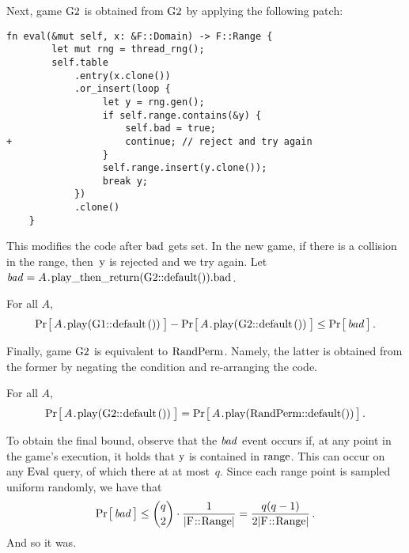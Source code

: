 Next, game $\code{G2}$ is obtained from $\code{G2}$ by applying the following patch:
%
\begin{lstlisting}[style=patch]
    fn eval(&mut self, x: &F::Domain) -> F::Range {
        let mut rng = thread_rng();
        self.table
            .entry(x.clone())
            .or_insert(loop {
                 let y = rng.gen();
                 if self.range.contains(&y) {
                     self.bad = true;
+                    continue; // reject and try again
                 }
                 self.range.insert(y.clone());
                 break y;
            })
            .clone()
    }
\end{lstlisting}
%
This modifies the code after $\code{bad}$ gets set. In the new game, if there
is a collision in the range, then~$\code{y}$ is rejected and we try again.
%
Let $\bad = A\code{.play_then_return(G2::default()).bad}$.
%
\begin{claim}
  For all $A$,
  \[
     \Prob{A\code{.play(G1::default())}} -
     \Prob{A\code{.play(G2::default())}} \leq \Prob{\bad} \,.
  \]
\end{claim}
%

Finally, game $\code{G2}$ is equivalent to
\hyperref[sec/func/ideal]{$\code{RandPerm}$}. Namely, the latter is obtained
from the former by negating the condition and re-arranging the code.
%
\begin{claim}
  For all $A$,
  \[
     \Prob{A\code{.play(G2::default())}} =
     \Prob{A\code{.play(RandPerm::default())}} \,.
  \]
\end{claim}
%

To obtain the final bound, observe that the $\mathit{bad}$ event occurs if, at any
point in the game's execution, it holds that $\code{y}$ is contained in
$\code{range}$.
%
This can occur on any \hyperref[sec/traits]{$\code{Eval}$} query, of which
there at at most~$q$.
%
Since each range point is sampled uniform randomly, we have that
%
\[
  \Prob{\bad} \leq
    \binom{q}{2} \cdot \frac{1}{|\code{F::Range}|} =
    \frac{q(q-1)}{2|\code{F::Range}|} \,.
\]
%
And so it was.
